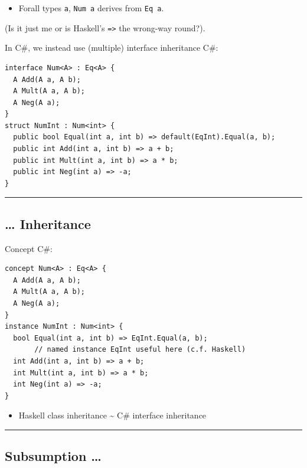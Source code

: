 \begin{itemize}
\tightlist
\item
  Forall types \lstinline!a!, \lstinline!Num a! derives from
  \lstinline!Eq a!.
\end{itemize}

(Is it just me or is Haskell's \lstinline!=>! the wrong-way round?).

In C\#, we instead use (multiple) interface inheritance C\#:

\begin{lstlisting}
interface Num<A> : Eq<A> {
  A Add(A a, A b);
  A Mult(A a, A b);
  A Neg(A a);
}
struct NumInt : Num<int> {
  public bool Equal(int a, int b) => default(EqInt).Equal(a, b);
  public int Add(int a, int b) => a + b;
  public int Mult(int a, int b) => a * b; 
  public int Neg(int a) => -a;
}
\end{lstlisting}

\begin{center}\rule{0.5\linewidth}{\linethickness}\end{center}

\subsection{\ldots{} Inheritance}\label{inheritance}

Concept C\#:

\begin{lstlisting}
concept Num<A> : Eq<A> {
  A Add(A a, A b);
  A Mult(A a, A b);
  A Neg(A a);
}
instance NumInt : Num<int> {
  bool Equal(int a, int b) => EqInt.Equal(a, b); 
       // named instance EqInt useful here (c.f. Haskell)
  int Add(int a, int b) => a + b;
  int Mult(int a, int b) => a * b; 
  int Neg(int a) => -a;
}
\end{lstlisting}

\begin{itemize}
\tightlist
\item
  Haskell class inheritance \textasciitilde{} C\# interface inheritance
\end{itemize}

\begin{center}\rule{0.5\linewidth}{\linethickness}\end{center}

\subsection{Subsumption \ldots{}}\label{subsumption}

